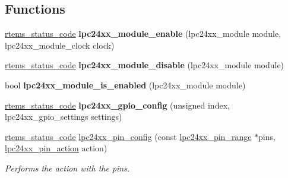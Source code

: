 \subsection*{Functions}
\begin{DoxyCompactItemize}
\item 
\mbox{\label{group__lpc24xx__io_gad66b0ee5f7531115187e982b321bf6ce}} 
\mbox{\hyperlink{group__ClassicStatus_ga545d41846817eaba6143d52ee4d9e9fe}{rtems\+\_\+status\+\_\+code}} {\bfseries lpc24xx\+\_\+module\+\_\+enable} (lpc24xx\+\_\+module module, lpc24xx\+\_\+module\+\_\+clock clock)
\item 
\mbox{\label{group__lpc24xx__io_ga9406e5e64c8e4ff3e4811016dea73ea0}} 
\mbox{\hyperlink{group__ClassicStatus_ga545d41846817eaba6143d52ee4d9e9fe}{rtems\+\_\+status\+\_\+code}} {\bfseries lpc24xx\+\_\+module\+\_\+disable} (lpc24xx\+\_\+module module)
\item 
\mbox{\label{group__lpc24xx__io_ga1d926841679554e22a2072a61ab98154}} 
bool {\bfseries lpc24xx\+\_\+module\+\_\+is\+\_\+enabled} (lpc24xx\+\_\+module module)
\item 
\mbox{\label{group__lpc24xx__io_gafba50009d1ed8d5456fbdad5a0781294}} 
\mbox{\hyperlink{group__ClassicStatus_ga545d41846817eaba6143d52ee4d9e9fe}{rtems\+\_\+status\+\_\+code}} {\bfseries lpc24xx\+\_\+gpio\+\_\+config} (unsigned index, lpc24xx\+\_\+gpio\+\_\+settings settings)
\item 
\mbox{\hyperlink{group__ClassicStatus_ga545d41846817eaba6143d52ee4d9e9fe}{rtems\+\_\+status\+\_\+code}} \mbox{\hyperlink{group__lpc24xx__io_gaaa704e4a54e338c74eebce54e23547cd}{lpc24xx\+\_\+pin\+\_\+config}} (const \mbox{\hyperlink{unionlpc24xx__pin__range}{lpc24xx\+\_\+pin\+\_\+range}} $\ast$pins, \mbox{\hyperlink{group__lpc24xx__io_ga5fb61bf67da6335979ce02d1d7f3630e}{lpc24xx\+\_\+pin\+\_\+action}} action)
\begin{DoxyCompactList}\small\item\em Performs the {\itshape action} with the {\itshape pins}. \end{DoxyCompactList}\end{DoxyCompactItemize}
